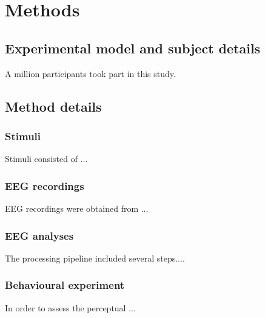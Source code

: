\section*{Methods}
\label{sec:methods}



\subsection*{Experimental model and subject details}
\label{subsec:Expt1_Subjects}
A million participants took part in this study.

\subsection*{Method details}
\label{subsec:method_details}

\subsubsection*{Stimuli}
\label{subsec:stimuli}
Stimuli consisted of ...


\subsubsection*{EEG recordings}
\label{subsec:eeg_recording}
\Ac{EEG} recordings were obtained from ... 

\subsubsection*{\ac{EEG} analyses}
\label{subsec:eeg_data_analyses}

The processing pipeline included several steps.... 


\subsubsection*{Behavioural experiment}
\label{subsec:anchoring_behavioural}
In order to assess the perceptual ...


